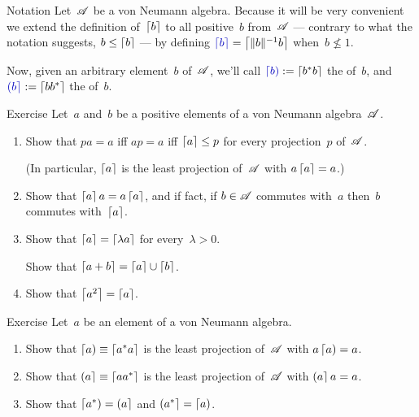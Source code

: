 \documentclass[a]{subfiles}
\begin{document}
\begin{parsec}%
\begin{point}{Notation}%
Let~$\mathscr{A}$ be a von Neumann algebra.
Because it will be very convenient
we extend the definition of~$\left\lceil b\right\rceil$
to all positive~$b$ from~$\mathscr{A}$
---
contrary to what the notation suggests,
$b\leq \left\lceil b\right\rceil$
---
by 
defining $\Define{\ceil{b}}=\ceil{\|b\|^{-1} b}$
when~$b\nleq 1$.

Now, given an arbitrary element~$b$ of~$\mathscr{A}$,
we'll call $\Define{\ceill{b}}:=\ceil{b^*b}$
the  of~$b$,
and~$\Define{\ceilr{b}}:=\ceil{bb^*}$ the  of~$b$.
\end{point}
\begin{point}{Exercise}%
Let~$a$ and~$b$ be a positive elements of a von Neumann algebra~$\mathscr{A}$.
\begin{enumerate}
\item
Show that $pa=a$ iff $ap=a$ iff $\left\lceil a\right\rceil\leq p$
for every projection~$p$ of~$\mathscr{A}$.

(In particular, $\left\lceil a\right\rceil$ is the least projection of~$\mathscr{A}$
with $a\left\lceil a\right\rceil=a$.)

\item
Show that $\left\lceil a\right\rceil a=a\left\lceil a\right\rceil$,
and if fact, if $b\in\mathscr{A}$ commutes with~$a$
then~$b$ commutes with~$\left\lceil a\right\rceil$.

\item
Show that $\left\lceil a\right\rceil=\left\lceil\lambda a\right\rceil$
for every~$\lambda>0$.

Show that $\left\lceil a+b\right\rceil=\left\lceil a\right\rceil\cup\left\lceil b\right\rceil$.
\item
Show that $\left\lceil a^2\right\rceil=\left\lceil a\right\rceil$.
\end{enumerate}
\end{point}
\begin{point}{Exercise}%
Let~$a$ be an element of a von Neumann algebra.
\begin{enumerate}
\item
Show that $\left\lceil a\right)\equiv \left\lceil a^*a\right\rceil$
is the least projection of~$\mathscr{A}$
with $a\left\lceil a\right)=a$.

\item
Show that $\left(a\right\rceil\equiv \left\lceil aa^*\right\rceil$
is the least projection of~$\mathscr{A}$
with $\left(a\right\rceil a=a$.

\item
Show that $\left\lceil a^*\right)=\left(a\right\rceil$
and $\left(a^*\right\rceil=\left\lceil a\right)$.
\end{enumerate}
\end{point}
\end{parsec}
\end{document}
